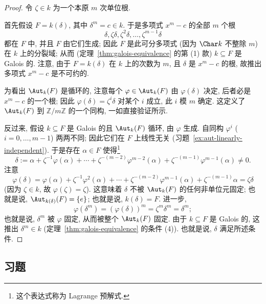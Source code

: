 \begin{proof}
令 $\zeta\in k$ 为一个本原 $m$ 次单位根.

首先假设 $F=k(\delta)$, 其中 $\delta^m=c\in k$. 于是多项式 $x^m-c$ 的全部 $m$ 个根
\[
\delta,\zeta\delta,\zeta^2\delta,\ldots,\zeta^{m-1}\delta
\]
都在 $F$ 中, 并且 $F$ 由它们生成; 因此 $F$ 是此可分多项式 (因为 $\Char k$ 不整除 $m$) 在 $k$ 上的分裂域; 从而 (定理~\ref{thm:galois-equivalence} 的第 (1) 款) $k\subseteq F$ 是 Galois 的. 注意, 由于 $F=k(\delta)$ 在 $k$ 上的次数为 $m$, 且 $\delta$ 是 $x^m-c$ 的根, 故推出多项式 $x^m-c$ 是不可约的.

为看出 $\Aut_k(F)$ 是循环的, 注意每个 $\varphi\in\Aut_k(F)$ 由 $\varphi(\delta)$ 决定, 后者必是 $x^m-c$ 的一个根; 因此 $\varphi(\delta)=\zeta^i\delta$ 对某个 $i$ 成立, 此 $i$ 模 $m$ 确定. 这定义了 $\Aut_k(F)$ 到 $\mathbb{Z}/m\mathbb{Z}$ 的一个同构, 一如直接验证所示.

反过来, 假设 $k\subseteq F$ 是 Galois 的且 $\Aut_k(F)$ 循环, 由 $\varphi$ 生成. 自同构 $\varphi^i$ ($i=0,\ldots,m-1$) 两两不同; 因此它们在 $F$ 上线性无关 (习题~\ref{ex:aut-linearly-independent}). 于是存在 $\alpha\in F$ 使得\footnote{这个表达式称为 Lagrange 预解式.}
\[
\delta:=\alpha+\zeta^{-1}\varphi(\alpha)+\cdots+\zeta^{-(m-2)}\varphi^{m-2}(\alpha)+\zeta^{-(m-1)}\varphi^{m-1}(\alpha)\neq 0.
\]
注意
\[
\varphi(\delta)=\varphi(\alpha)+\zeta^{-1}\varphi^2(\alpha)+\cdots+\zeta^{-(m-2)}\varphi^{m-1}(\alpha)+\zeta^{-(m-1)}\alpha=\zeta\delta
\]
(因为 $\zeta\in k$, 故 $\varphi(\zeta)=\zeta$). 这意味着 $\delta$ 不被 $\Aut_k(F)$ 的任何非单位元固定; 也就是说, $\Aut_{k(\delta)}(F)=\{e\}$; 也就是说, $k(\delta)=F$. 进一步,
\[
\varphi(\delta^m)=(\varphi(\delta))^m=\zeta^m\delta^m=\delta^m;
\]
也就是说, $\delta^m$ 被 $\varphi$ 固定, 从而被整个 $\Aut_k(F)$ 固定. 由于 $k\subseteq F$ 是 Galois 的, 这推出 $\delta^m\in k$ (定理~\ref{thm:galois-equivalence} 的条件 (4)). 也就是说, $\delta$ 满足所述条件.
\end{proof}

\subsection*{习题}
{}

